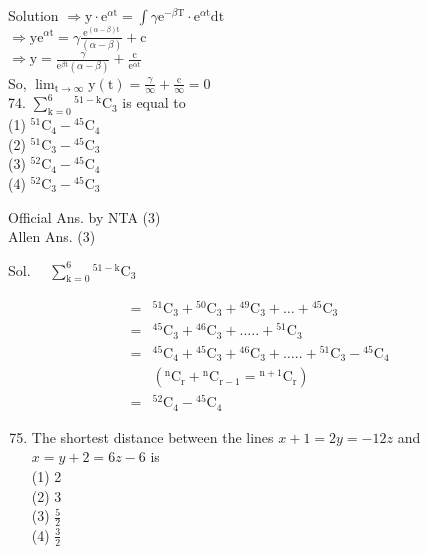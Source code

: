 \documentclass[10pt]{article}
\begin{document}
Solution \(\Rightarrow \mathrm{y} \cdot \mathrm{e}^{\alpha \mathrm{t}}=\int \gamma \mathrm{e}^{-\beta \mathrm{T}} \cdot \mathrm{e}^{\alpha \mathrm{t}} \mathrm{dt}\)\\
\(\Rightarrow \mathrm{ye}^{\alpha \mathrm{t}}=\gamma \frac{\mathrm{e}^{(\alpha-\beta) \mathrm{t}}}{(\alpha-\beta)}+\mathrm{c}\)\\
\(\Rightarrow \mathrm{y}=\frac{\gamma}{\mathrm{e}^{\beta \mathrm{t}}(\alpha-\beta)}+\frac{\mathrm{c}}{\mathrm{e}^{\alpha \mathrm{t}}}\)\\
So, \(\lim _{\mathrm{t} \rightarrow \infty} \mathrm{y}(\mathrm{t})=\frac{\gamma}{\infty}+\frac{\mathrm{c}}{\infty}=0\)\\
74. \(\sum_{\mathrm{k}=0}^{6}{ }^{51-\mathrm{k}} \mathrm{C}_{3}\) is equal to\\
(1) \({ }^{51} \mathrm{C}_{4}-{ }^{45} \mathrm{C}_{4}\)\\
(2) \({ }^{51} \mathrm{C}_{3}-{ }^{45} \mathrm{C}_{3}\)\\
(3) \({ }^{52} \mathrm{C}_{4}-{ }^{45} \mathrm{C}_{4}\)\\
(4) \({ }^{52} \mathrm{C}_{3}-{ }^{45} \mathrm{C}_{3}\)

Official Ans. by NTA (3)\\
Allen Ans. (3)

Sol. \(\quad \sum_{\mathrm{k}=0}^{6}{ }^{51-\mathrm{k}} \mathrm{C}_{3}\)

\[
\begin{aligned}
= & { }^{51} \mathrm{C}_{3}+{ }^{50} \mathrm{C}_{3}+{ }^{49} \mathrm{C}_{3}+\ldots+{ }^{45} \mathrm{C}_{3} \\
= & { }^{45} \mathrm{C}_{3}+{ }^{46} \mathrm{C}_{3}+\ldots . .+{ }^{51} \mathrm{C}_{3} \\
= & { }^{45} \mathrm{C}_{4}+{ }^{45} \mathrm{C}_{3}+{ }^{46} \mathrm{C}_{3}+\ldots . .+{ }^{51} \mathrm{C}_{3}-{ }^{45} \mathrm{C}_{4} \\
& \left({ }^{\mathrm{n}} \mathrm{C}_{\mathrm{r}}+{ }^{\mathrm{n}} \mathrm{C}_{\mathrm{r}-1}={ }^{\mathrm{n}+1} \mathrm{C}_{\mathrm{r}}\right) \\
= & { }^{52} \mathrm{C}_{4}-{ }^{45} \mathrm{C}_{4}
\end{aligned}
\]

\begin{enumerate}
  \setcounter{enumi}{74}
  \item The shortest distance between the lines \(x+1=2 y=- 12 z\) and \(x=y+2=6 z-6\) is\\
(1) 2\\
(2) 3\\
(3) \(\frac{5}{2}\)\\
(4) \(\frac{3}{2}\)
\end{enumerate}
\end{document}
